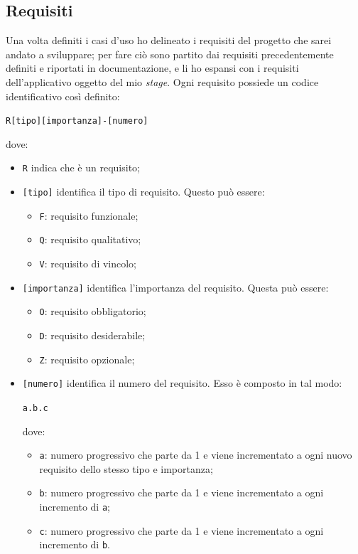 \subsection{Requisiti}

Una volta definiti i casi d'uso ho delineato i requisiti del progetto che sarei andato a sviluppare; per fare ciò sono partito dai requisiti precedentemente definiti e riportati in documentazione, e li ho espansi con i requisiti dell'applicativo oggetto del mio \textit{stage}. Ogni requisito possiede un codice identificativo così definito:
\begin{center}
  \centering
  \texttt{R[tipo][importanza]-[numero]}
\end{center} dove:
\begin{itemize}
  \item \texttt{R} indica che è un requisito;
  \item \texttt{[tipo]} identifica il tipo di requisito. Questo può essere:
  \begin{itemize}
    \item \texttt{F}: requisito funzionale;
    \item \texttt{Q}: requisito qualitativo;
    \item \texttt{V}: requisito di vincolo;
  \end{itemize}
  \item \texttt{[importanza]} identifica l'importanza del requisito. Questa può essere:
  \begin{itemize}
    \item \texttt{O}: requisito obbligatorio;
    \item \texttt{D}: requisito desiderabile;
    \item \texttt{Z}: requisito opzionale;
  \end{itemize}
  \item \texttt{[numero]} identifica il numero del requisito. Esso è composto in tal modo:
  \begin{center}
    \centering
    \texttt{a.b.c}
  \end{center} dove:
  \begin{itemize}
    \item \texttt{a}: numero progressivo che parte da 1 e viene incrementato a ogni nuovo requisito dello stesso tipo e importanza;
    \item \texttt{b}: numero progressivo che parte da 1 e viene incrementato a ogni incremento di \texttt{a};
    \item \texttt{c}: numero progressivo che parte da 1 e viene incrementato a ogni incremento di \texttt{b}.
  \end{itemize}
\end{itemize}

